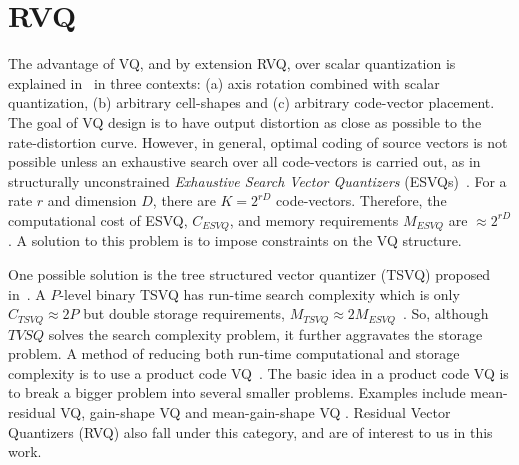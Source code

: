 \documentclass{article}
\begin{document}
%

\section{RVQ}
\label{sec:types_VQ}
The advantage of VQ, and by extension RVQ, over scalar quantization is explained in~\cite{1985_JNL_VQ_Makhoul} in three contexts: (a) axis rotation combined with scalar quantization, (b) arbitrary cell-shapes and (c) arbitrary code-vector placement.  The goal of VQ design is to have output distortion as close as possible to the rate-distortion curve.  However, in general, optimal coding of source vectors is not possible unless an exhaustive search over all code-vectors is carried out, as in structurally unconstrained \emph{Exhaustive Search Vector Quantizers} (ESVQs)~\cite{1996_JNL_AdvancesRVQ_Barnes}.  For a rate $r$ and dimension $D$, there are $K=2^{rD}$ code-vectors.  Therefore, the computational cost of ESVQ, $C_{ESVQ}$, and memory requirements $M_{ESVQ}$ are $\approx 2^{rD}$.  A solution to this problem is to impose constraints on the VQ structure.  

One possible solution is the tree structured vector quantizer (TSVQ) proposed in~\cite{1980_JNL_TSVQ_Buzo}.  A $P$-level binary TSVQ has run-time search complexity which is only $C_{TSVQ} \approx 2P$ but double storage requirements, $M_{TSVQ} \approx 2 M_{ESVQ}$~\cite{1996_JNL_AdvancesRVQ_Barnes}.   So, although $TVSQ$ solves the search complexity problem, it further aggravates the storage problem.  A method of reducing both run-time computational and storage complexity is to use a product code VQ~\cite{1991_BOOK_VQ_GershoGray}.  The basic idea in a product code VQ is to break a bigger problem into several smaller problems.  Examples include mean-residual VQ, gain-shape VQ and mean-gain-shape VQ \cite{1996_JNL_AdvancesRVQ_Barnes}.  Residual Vector Quantizers (RVQ) also fall under this category, and are of interest to us in this work. 
\end{document}
